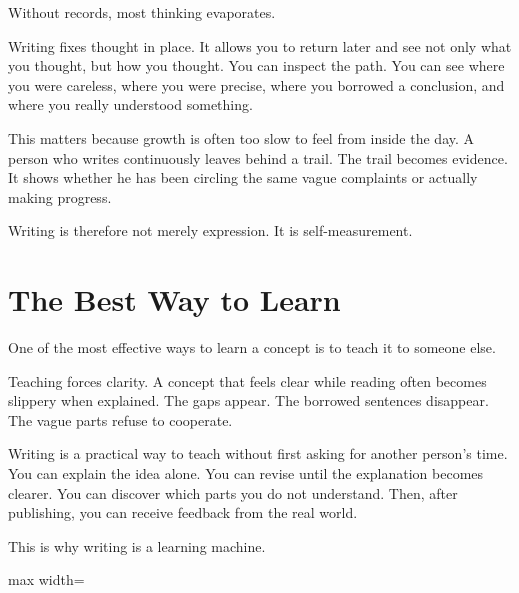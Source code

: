 Without records, most thinking evaporates.

Writing fixes thought in place. It allows you to return later and see not only what you thought, but how you thought. You can inspect the path. You can see where you were careless, where you were precise, where you borrowed a conclusion, and where you really understood something.

This matters because growth is often too slow to feel from inside the day. A person who writes continuously leaves behind a trail. The trail becomes evidence. It shows whether he has been circling the same vague complaints or actually making progress.

Writing is therefore not merely expression. It is self-measurement.

\section*{The Best Way to Learn}

One of the most effective ways to learn a concept is to teach it to someone else.

Teaching forces clarity. A concept that feels clear while reading often becomes slippery when explained. The gaps appear. The borrowed sentences disappear. The vague parts refuse to cooperate.

Writing is a practical way to teach without first asking for another person's time. You can explain the idea alone. You can revise until the explanation becomes clearer. You can discover which parts you do not understand. Then, after publishing, you can receive feedback from the real world.

This is why writing is a learning machine.

\begin{center}
\begin{adjustbox}{max width=\linewidth}
\end{adjustbox}
\end{center}

